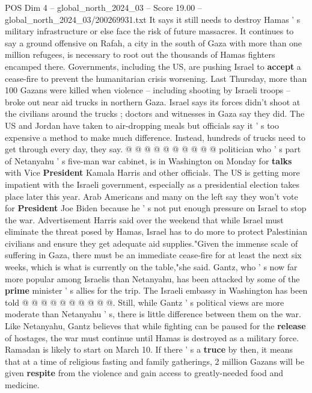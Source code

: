 \begin{textsample}{POS Dim 4 – global\_north\_2024\_03 – Score 19.00 – global\_north\_2024\_03/200269931.txt}
It says it still needs to destroy Hamas ' s military infrastructure or else face the risk of future massacres.
It continues to say a ground offensive on Rafah, a city in the south of Gaza with more than one million refugees, is necessary to root out the thousands of Hamas fighters encamped there.
Governments, including the US, are pushing Israel to \textbf{accept} a cease-fire to prevent the humanitarian crisis worsening.
Last Thursday, more than 100 Gazans were killed when violence -- including shooting by Israeli troops -- broke out near aid trucks in northern Gaza.
Israel says its forces didn't shoot at the civilians around the trucks ; doctors and witnesses in Gaza say they did.
The US and Jordan have taken to air-dropping meals but officials say it ' s too expensive a method to make much difference.
Instead, hundreds of trucks need to get through every day, they say. @ @ @ @ @ @ @ @ @ @ politician who ' s part of Netanyahu ' s five-man war cabinet, is in Washington on Monday for \textbf{talks} with Vice \textbf{President} Kamala Harris and other officials.
The US is getting more impatient with the Israeli government, especially as a presidential election takes place later this year.
Arab Americans and many on the left say they won't vote for \textbf{President} Joe Biden because he ' s not put enough pressure on Israel to stop the war.
Advertisement Harris said over the weekend that while Israel must eliminate the threat posed by Hamas, Israel has to do more to protect Palestinian civilians and ensure they get adequate aid supplies."Given the immense scale of suffering in Gaza, there must be an immediate cease-fire for at least the next six weeks, which is what is currently on the table,"she said.
Gantz, who ' s now far more popular among Israelis than Netanyahu, has been attacked by some of the \textbf{prime} minister ' s allies for the trip.
The Israeli embassy in Washington has been told @ @ @ @ @ @ @ @ @ @.
Still, while Gantz ' s political views are more moderate than Netanyahu ' s, there is little difference between them on the war.
Like Netanyahu, Gantz believes that while fighting can be paused for the \textbf{release} of hostages, the war must continue until Hamas is destroyed as a military force.
Ramadan is likely to start on March 10.
If there ' s a \textbf{truce} by then, it means that at a time of religious fasting and family gatherings, 2 million Gazans will be given \textbf{respite} from the violence and gain access to greatly-needed food and medicine.

\end{textsample}

